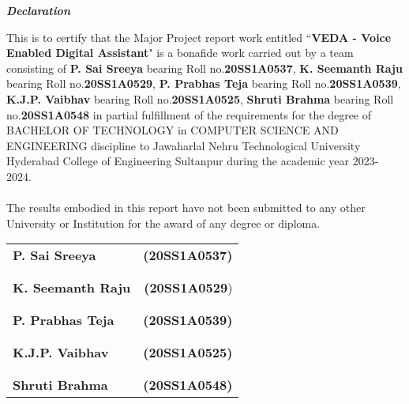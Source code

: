 \documentclass[12pt,a4paper]{report}
\begin{document}
\newpage
{}	
\begin{center}
{\LARGE \textbf{\textit{Declaration}}}
\end{center}	
\vspace{2cm}
{\large This is to certify that the Major Project report work entitled “\textbf{VEDA - Voice Enabled Digital Assistant}" is a bonafide work carried out by a team consisting of \textbf{P. Sai Sreeya} bearing Roll no.\textbf{20SS1A0537}, \textbf{K. Seemanth Raju} bearing Roll no.\textbf{20SS1A0529}, \textbf{P. Prabhas Teja} bearing Roll no.\textbf{20SS1A0539},\textbf{ K.J.P. Vaibhav }bearing Roll no.\textbf{20SS1A0525}, \textbf{Shruti Brahma} bearing Roll no.\textbf{20SS1A0548} in partial fulfillment of the requirements for the degree of BACHELOR OF TECHNOLOGY in COMPUTER SCIENCE AND ENGINEERING discipline to  Jawaharlal Nehru Technological University Hyderabad College of Engineering Sultanpur during the academic year 2023- 2024.\\ \\
The results embodied in this report have not been submitted to any other University or Institution for the award of any degree or diploma.}\\
\vspace{2.5cm}
\begin{table}[ht]
	\begin{flushright}
		\begin{tabular}{l r}
		{\large \textbf{P. Sai Sreeya}} & {\large \textbf{(20SS1A0537)}}\\\\\\
		{\large \textbf{K. Seemanth Raju}} & {\large\textbf{(20SS1A0529}})\\\\\\
        {\large \textbf{P. Prabhas Teja}} & {\large \textbf{(20SS1A0539)}}\\\\\\
		{\large \textbf{K.J.P. Vaibhav}} & {\large\textbf{(20SS1A0525)}}\\\\\\
        {\large \textbf{Shruti Brahma}} & {\large \textbf{(20SS1A0548)}}
	\end{tabular}
	\end{flushright}
\end{table}
\end{document}
